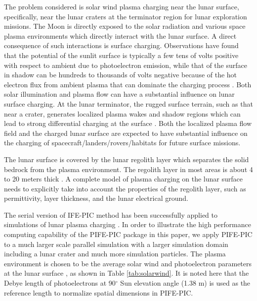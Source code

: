 \documentclass{siamart171218}
\begin{document}
The problem considered is solar wind plasma charging near the lunar surface,
specifically, near the lunar craters at the terminator region
for lunar exploration missions.
The Moon is directly exposed
to the solar radiation and various space plasma environments
which directly interact with the lunar surface.
A direct consequence of such interactions is surface charging.
Observations have found that the potential of the sunlit surface is typically
a few tens of volts positive with respect to ambient due to photoelectron emission,
while that of the surface in shadow can be hundreds to thousands of volts negative
because of the hot electron flux from ambient plasma
that can dominate the charging process
\cite{Apollo17_PSR_1973,
Freeman_moon1975_electric,
Halekas_grl2007_lunar_charging,
Halekas_jgr2008_lp,
Halekas_pss2011_new_views,Reasoner_jgr1972_lunar_photoe_layer,Stubbs_LunarSurfaceCharging_2005,
Willis_1973_phe_se}.
Both solar illumination and plasma flow
can have a substantial influence on lunar surface charging.
At the lunar terminator,
the rugged surface terrain, such as that near a crater,
generates localized plasma wakes and shadow regions which
can lead to strong differential charging at the surface
\cite{Berg_epsl1978_lunar_terminator_config,Poppe_icarus2012_topography,
JW_IEEE_2008_LunarDust}.
Both the localized plasma flow field and the charged lunar surface are expected
to have substantial influence on the charging of spacecraft/landers/rovers/habitats
for future surface missions.

The lunar surface is covered by the lunar regolith layer which separates the solid bedrock
from the plasma environment.
The regolith layer in most areas is about 4 to 20 meters thick
\cite{lunarsourcebook_ch7_regolith,shkuratov_icarus2001_regolith}.
A complete model of plasma charging on the lunar surface
needs to explicitly take into account
the properties of the regolith layer, such as permittivity, layer thickness,
and the lunar electrical ground.

The serial version of IFE-PIC method has been successfully applied to
simulations of lunar plasma charging
\cite{Han_jsr_2018_lunar}.
In order to illustrate the high performance computing capability
of the PIFE-PIC package in this paper,
we %
apply PIFE-PIC to a much larger scale parallel simulation with
a larger simulation domain including a lunar crater
and much more simulation particles.
%
%
The plasma environment is chosen to be the average solar wind
and photoelectron parameters at the lunar surface \cite{JW_IEEE_2008_LunarDust},
as shown in Table \ref{tab:solarwind}.
It is noted here that the Debye length of photoelectrons at 90$^\circ$ Sun elevation angle
(1.38 m) is used as the reference length to normalize spatial dimensions in PIFE-PIC.
\end{document}
